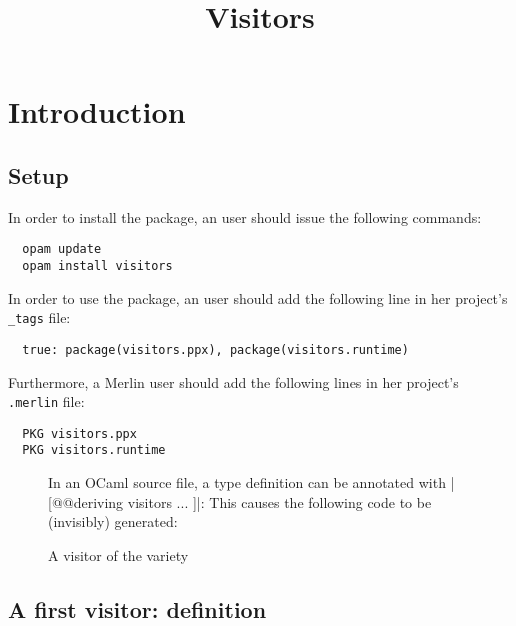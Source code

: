 \documentclass[onecolumn,11pt,nocopyrightspace]{sigplanconf}
\title{Visitors}
\begin{document}
\maketitle


\clearpage


\section{Introduction}
\label{sec:intro}

\subsection{Setup}
\label{sec:intro:setup}

In order to install the \visitors package, an \opam user should issue the
following commands:
\begin{verbatim}
  opam update
  opam install visitors
\end{verbatim}
In order to use the \visitors package, an \ocamlbuild user should add the
following line in her project's \texttt{\_tags} file:
\begin{lstlisting}
  true: package(visitors.ppx), package(visitors.runtime)
\end{lstlisting}
Furthermore, a Merlin user should add the following lines in her project's
\texttt{.merlin} file:
\begin{lstlisting}
  PKG visitors.ppx
  PKG visitors.runtime
\end{lstlisting}


\begin{figure}[t]
In an OCaml source file, a type definition can be annotated with
\oc|[@@deriving visitors { ... }]|:
This causes the following code to be (invisibly) generated:
\caption{A visitor of the \iter variety}
\label{fig:expr00}
\end{figure}

\subsection{A first visitor: definition}
\label{sec:intro:iter:def}
\end{document}
